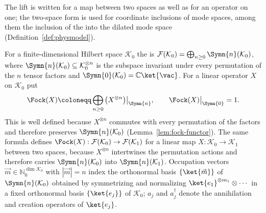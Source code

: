 
The lift is written for a map between two spaces as well as for an operator on
one; the two-space form is used for coordinate inclusions of mode spaces,
among them the inclusion of the  into the dilated
mode space (Definition~\ref{def:physmodel}).

\begin{definition}
\label{def:fock}
For a finite-dimensional Hilbert space $\mathcal{K}_0$ the  is
$\mathcal{F}(\mathcal{K}_0)=\bigoplus_{n\ge0}\Symn{n}(\mathcal{K}_0)$, where
$\Symn{n}(\mathcal{K}_0)\subseteq\mathcal{K}_0^{\otimes n}$ is the subspace
invariant under every permutation of the $n$ tensor factors and
$\Symn{0}(\mathcal{K}_0)=\mathbb{C}\ket{\vac}$. For a linear operator $X$ on
$\mathcal{K}_0$ put
\begin{equation}\label{eq:fockfunctor}
  \Fock(X)\coloneqq\bigoplus_{n\ge0}\big(X^{\otimes n}\big)\big|_{\Symn{n}},
  \qquad \Fock(X)\big|_{\Symn{0}}=1 .
\end{equation}
This is well defined because $X^{\otimes n}$ commutes with every permutation of
the factors and therefore preserves $\Symn{n}(\mathcal{K}_0)$
(Lemma~\ref{lem:fock-functor}). The same formula defines
$\Fock(X):\mathcal{F}(\mathcal{K}_0)\to\mathcal{F}(\mathcal{K}_1)$ for a linear
map $X:\mathcal{K}_0\to\mathcal{K}_1$ between two spaces, because
$X^{\otimes n}$ intertwines the permutation actions and therefore carries
$\Symn{n}(\mathcal{K}_0)$ into $\Symn{n}(\mathcal{K}_1)$. Occupation vectors
$\vec m\in\mathbb{N}_0^{\dim\mathcal{K}_0}$ with $|\vec m|=n$ index the
orthonormal basis $\{\ket{\vec m}\}$ of $\Symn{n}(\mathcal{K}_0)$ obtained by
symmetrizing and normalizing $\ket{e_1}^{\otimes m_1}\otimes\cdots$ in a fixed
orthonormal basis $\{\ket{e_j}\}$ of $\mathcal{K}_0$; $a_j$ and $a_j^\dagger$
denote the annihilation and creation operators of $\ket{e_j}$.
\end{definition}
